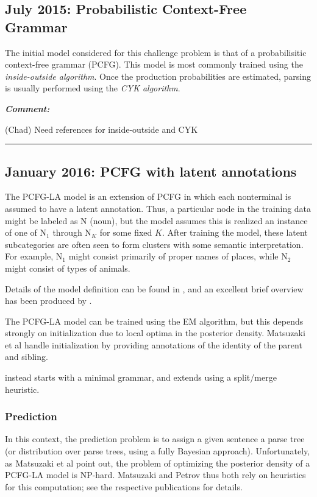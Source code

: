\documentclass[english]{article}
\renewenvironment{comment}
    {%
     \par\medskip\noindent
     \tabularx{\textwidth}{|>{\columncolor[gray]{0.9}}X|}
     \hline
     \emph{\textbf{Comment:}}%
    }
    {%
     \endtabularx\hrule\par\medskip
    }
\begin{document}
\subsection{July 2015: Probabilistic Context-Free Grammar}

The initial model considered for this challenge problem is that of a probabilisitic context-free grammar (PCFG). This model is most commonly trained using the \emph{inside-outside algorithm}. Once the production probabilities are estimated, parsing is usually performed using the \emph{CYK algorithm}. 

\begin{comment}
(Chad) Need references for inside-outside and CYK
\end{comment}

\subsection{January 2016: PCFG with latent annotations}

The PCFG-LA model is an extension of PCFG in which each nonterminal is assumed to have a latent annotation. Thus, a particular node in the training data might be labeled as N (noun), but the model assumes this is realized an instance of one of N$_{1}$ through N$_{K}$ for some fixed $K$. After training the model, these latent subcategories are often seen to form clusters with some semantic interpretation. For example, N$_{1}$ might consist primarily of proper names of places, while N$_{2}$ might consist of types of animals.

Details of the model definition can be found in \citet{Matsuzaki2005}, and an excellent brief overview has been produced by \citet{Manning2012}.

The PCFG-LA model can be trained using the EM algorithm, but this depends strongly on initialization due to local optima in the posterior density. Matsuzaki et al handle initialization by providing annotations of the identity of the parent and sibling. 

\citet{Petrov2006} instead starts with a minimal grammar, and extends using a split/merge heuristic. 

\subsubsection*{Prediction}

In this context, the prediction problem is to assign a given sentence a parse tree (or distribution over parse trees, using a fully Bayesian approach). Unfortunately, as Matsuzaki et al point out, the problem of optimizing the posterior density of a PCFG-LA model is NP-hard. Matsuzaki and Petrov thus both rely on heuristics for this computation; see the respective publications for details.
\end{document}
